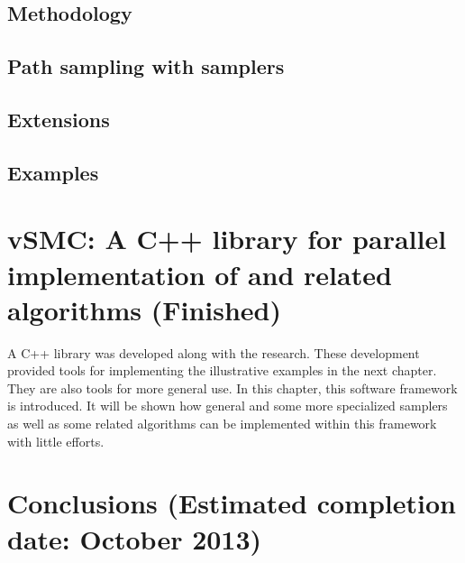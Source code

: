\documentclass[11pt, fontset=Minion, showoverfull, toclevel=2,
bib, biblatexstyle=numeric, mintcode, minted=cache]{marticle}
\def\finish#1{(Estimated completion date: #1 2013)}
\begin{document}
\subsection{Methodology}

\subsection{Path sampling with \smc samplers}

\subsection{Extensions}

\subsection{Examples}

\section{vSMC: A C++ library for parallel implementation of \smc and
  related algorithms (Finished)}

A C++ library was developed along with the research. These development
provided tools for implementing the illustrative examples in the next chapter.
They are also tools for more general use. In this chapter, this software
framework is introduced. It will be shown how general and some more
specialized \smc samplers as well as some related algorithms can be
implemented within this framework with little efforts.

\section{Conclusions \finish{October}}

\printbibliography[heading=reference]
\end{document}
